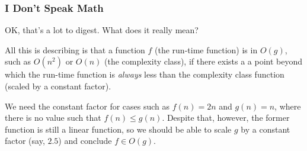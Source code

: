 \documentclass[aspectratio=169, handout]{beamer}
\begin{document}
\begin{frame}[fragile]
  \frametitle{I Don't Speak Math}

  OK, that's a lot to digest. What does it really mean?

  \pause
  \vspace{\fill}

  All this is describing is that a function
  $f$ (the run-time function) is in $O(g)$, such as $O(n^2)$ or $O(n)$ (the
  complexity class), if there exists a a point beyond which the
  run-time function is \textit{always} less than the complexity class function (scaled by
  a constant factor).

  \pause
  \vspace{\fill}

  We need the constant factor for cases such as $f(n) = 2n$ and $g(n) = n$, where
  there is no value such that $f(n) \leq g(n)$. Despite that, however, the former
  function is still a linear function, so we should be able to scale $g$
  by a constant factor (say, $2.5$) and conclude $f \in O(g)$.
\end{frame}


\end{document}
